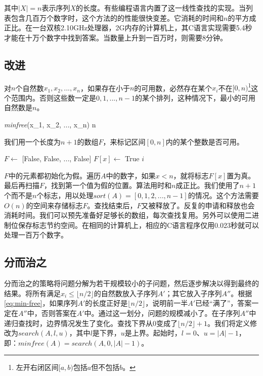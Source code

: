 \documentclass[b5paper]{ctexart}
\begin{document}
其中$|X| = n$表示序列$X$的长度。有些编程语言内置了这一线性查找的实现。当列表包含几百万个数字时，这个方法的的性能很快变差。它消耗的时间和$n$的平方成正比。在一台双核2.10GHz处理器，2G内存的计算机上，其C语言实现需要5.4秒才能在十万个数字中找到答案。当数量上升到一百万时，则需要8分钟。

\subsection*{改进}
对$n$个自然数$x_1, x_2, ..., x_n$，如果存在小于$n$的可用数，必然存在某个$x_i$不在$[0, n)$\footnote{左开右闭区间$[a, b)$包括$a$但不包括$b$。}这个范围内。否则这些数一定是$0, 1, ..., n - 1$的某个排列，这种情况下，最小的可用自然数是$n$。

\be
\textit{minfree}(x_1, x_2, ..., x_n) \leq n
\label{eq:min-free}
\ee

我们用一个长度为$n + 1$的数组$F$，来标记区间$[0, n]$内的某个整数是否可用。

\begin{algorithmic}[1]
  \State $F \gets$ [False, False, ..., False] 
      \State $F[x] \gets$ True
    \EndIf
  \EndFor
      \State \Return $i$
    \EndIf
  \EndFor
\EndFunction
\end{algorithmic}

$F$中的元素都初始化为假。遍历$A$中的数字，如果$x < n$，就将标志$F[x]$置为真。最后再扫描$F$，找到第一个值为假的位置。算法用时和$n$成正比。我们使用了$n + 1$个而不是$n$个标志，用以处理$sort(A) = [0, 1, 2, ..., n-1]$的情况。这个方法需要$O(n)$的空间来存储标志$F$。查找结束后，$F$又被释放了。反复的申请和释放也会消耗时间。我们可以预先准备好足够长的数组，每次查找复用。另外可以使用二进制位保存标志节约空间。在相同的计算机上，相应的C语言程序仅用0.023秒就可以处理一百万个数字。

\subsection*{分而治之}
分而治之的策略将问题分解为若干规模较小的子问题，然后逐步解决以得到最终的结果。将所有满足$x_i \leq \lfloor n/2 \rfloor$的自然数放入子序列$A'$；其它放入子序列$A''$。根据\cref{eq:min-free}，如果序列$A'$的长度正好是$\lfloor n/2 \rfloor$，说明前一半$A'$已经“满了”，答案一定在$A''$中，否则答案在$A'$中。通过这一划分，问题的规模减小了。在子序列$A''$中递归查找时，边界情况发生了变化。查找下界从0变成了$\lfloor n/2 \rfloor + 1$。我们将定义修改为$search(A, l, u)$，其中$l$是下界，$u$是上界。起始时，$l = 0$、$u = |A| - 1$，即：$minfree(A) = search(A, 0, |A|-1)$。
\end{document}
